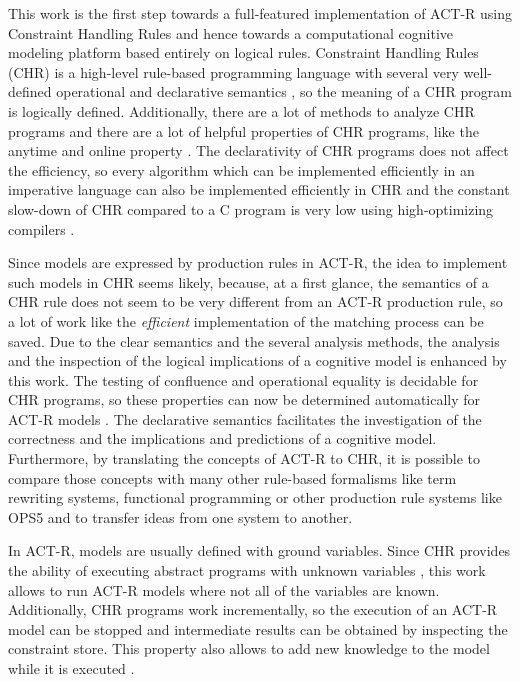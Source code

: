 This work is the first step towards a full-featured implementation of ACT-R using Constraint Handling Rules and hence towards a computational cognitive modeling platform based entirely on logical rules. Constraint Handling Rules (CHR) is a high-level rule-based programming language with several very well-defined operational and declarative semantics \cite[49\psqq]{fru_chr_book_2009}, so the meaning of a CHR program is logically defined. Additionally, there are a lot of methods to analyze CHR programs \cite[96\psqq]{fru_chr_book_2009} and there are a lot of helpful properties of CHR programs, like the anytime and online property \cite[83\psqq]{fru_chr_book_2009}. The declarativity of CHR programs does not affect the efficiency, so every algorithm which can be implemented efficiently in an imperative language can also be implemented efficiently in CHR and the constant slow-down of CHR compared to a C program is very low using high-optimizing compilers \cite[94]{fru_chr_book_2009}.

Since models are expressed by production rules in ACT-R, the idea to implement such models in CHR seems likely, because, at a first glance, the semantics of a CHR rule does not seem to be very different from an ACT-R production rule, so a lot of work like the \emph{efficient} implementation of the matching process can be saved. Due to the clear semantics and the several analysis methods, the analysis and the inspection of the logical implications of a cognitive model is enhanced by this work. The testing of confluence and operational equality is decidable for CHR programs, so these properties can now be determined automatically for ACT-R models \cite[4]{chr_lecture_chap6}. The declarative semantics facilitates the investigation of the correctness and the implications and predictions of a cognitive model. Furthermore, by translating the concepts of ACT-R to CHR, it is possible to compare those concepts with many other rule-based formalisms like term rewriting systems, functional programming or other production rule systems like OPS5 and to transfer ideas from one system to another\cite[141\psqq]{fru_chr_book_2009}. 

In ACT-R, models are usually defined with ground variables. Since CHR provides the ability of executing abstract programs with unknown variables \cite[4]{chr_lecture_chap6}, this work allows to run ACT-R models where not all of the variables are known. Additionally, CHR programs work incrementally, so the execution of an ACT-R model can be stopped and intermediate results can be obtained by inspecting the constraint store. This property also allows to add new knowledge to the model while it is executed \cite[176]{fru_chr_book_2009}.

